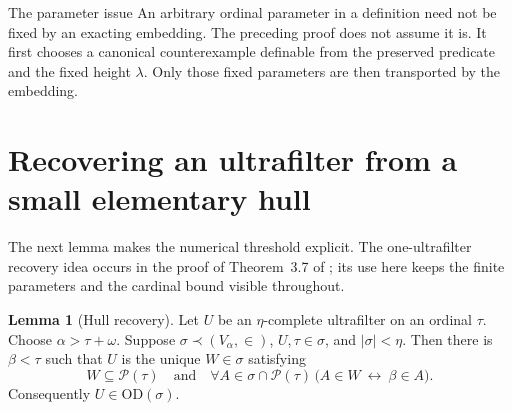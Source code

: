 \documentclass[11pt,letterpaper]{article}
\theoremstyle{definition}
\newtheorem{lemma}[definition]{Lemma}
\newcommand{\OD}{\mathrm{OD}}
\newcommand{\Pow}{\mathcal P}
\numberwithin{equation}{section}
\begin{document}
\begin{assessment}{The parameter issue}
An arbitrary ordinal parameter in a definition need not be fixed by an exacting embedding. The preceding proof does not assume it is. It first chooses a canonical counterexample definable from the preserved predicate and the fixed height $\lambda$. Only those fixed parameters are then transported by the embedding.
\end{assessment}

\section{Recovering an ultrafilter from a small elementary hull}\label{sec:recovery}

The next lemma makes the numerical threshold explicit. The one-ultrafilter recovery idea occurs in the proof of Theorem~3.7 of \cite{cover}; its use here keeps the finite parameters and the cardinal bound visible throughout.

\begin{lemma}[Hull recovery]\label{lem:recovery}
Let $U$ be an $\eta$-complete ultrafilter on an ordinal $\tau$. Choose $\alpha>\tau+\omega$. Suppose $\sigma\prec(V_\alpha,\in)$, $U,\tau\in\sigma$, and $|\sigma|<\eta$. Then there is $\beta<\tau$ such that $U$ is the unique $W\in\sigma$ satisfying
\begin{equation}\label{eq:traceformula}
 W\subseteq\Pow(\tau)
 \quad\text{and}\quad
 \forall A\in\sigma\cap\Pow(\tau)\,
       \bigl(A\in W\ \longleftrightarrow\ \beta\in A\bigr).
\end{equation}
Consequently $U\in\OD(\sigma)$.
\end{lemma}
\end{document}
